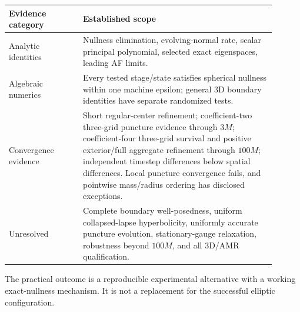 \documentclass[11pt]{article}
\begin{document}
\begin{center}
\begin{tabular}{p{0.25\linewidth}p{0.65\linewidth}}
\toprule
Evidence category & Established scope\\
\midrule
Analytic identities & Nullness elimination, evolving-normal rate, scalar principal polynomial, selected exact eigenspaces, leading AF limits.\\
Algebraic numerics & Every tested stage/state satisfies spherical nullness within one machine epsilon; general 3D boundary identities have separate randomized tests.\\
Convergence evidence & Short regular-center refinement; coefficient-two three-grid puncture evidence through $3M$; coefficient-four three-grid survival and positive exterior/full aggregate refinement through $100M$; independent timestep differences below spatial differences. Local puncture convergence fails, and pointwise mass/radius ordering has disclosed exceptions.\\
Unresolved & Complete boundary well-posedness, uniform collapsed-lapse hyperbolicity, uniformly accurate puncture evolution, stationary-gauge relaxation, robustness beyond $100M$, and all 3D/AMR qualification.\\
\bottomrule
\end{tabular}
\end{center}
The practical outcome is a reproducible experimental alternative with a working exact-nullness mechanism. It is not a replacement for the successful elliptic configuration.
\end{document}
